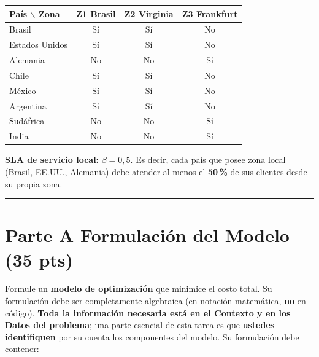 \documentclass[12pt,a4paper]{article}
\begin{document}
\begin{center}
\renewcommand{\arraystretch}{1.2}
\begin{tabular}{lccc}
\toprule
\textbf{País $\backslash$ Zona} &
\textbf{Z1 Brasil} & \textbf{Z2 Virginia} & \textbf{Z3 Frankfurt} \\
\midrule
Brasil          & Sí & Sí & No \\
Estados Unidos  & Sí & Sí & No \\
Alemania        & No & No & Sí \\
Chile           & Sí & Sí & No \\
México          & Sí & Sí & No \\
Argentina       & Sí & Sí & No \\
Sudáfrica       & No & No & Sí \\
India           & No & No & Sí \\
\bottomrule
\end{tabular}
\end{center}

\textbf{SLA de servicio local:} $\beta = 0{,}5$. Es decir, cada país que posee
zona local (Brasil, EE.UU., Alemania) debe atender al menos el \textbf{50\,\%}
de sus clientes desde su propia zona.

\noindent\rule{\linewidth}{0.4pt}

\section*{Parte A \quad Formulación del Modelo \hfill\normalfont\normalsize(35 pts)}

Formule un \textbf{modelo de optimización} que minimice el costo total. Su
formulación debe ser completamente algebraica (en notación matemática,
\textbf{no} en código). \textbf{Toda la información necesaria está en el
Contexto y en los Datos del problema}; una parte esencial de esta tarea es que
\textbf{ustedes identifiquen} por su cuenta los componentes del modelo. Su
formulación debe contener:
\end{document}
